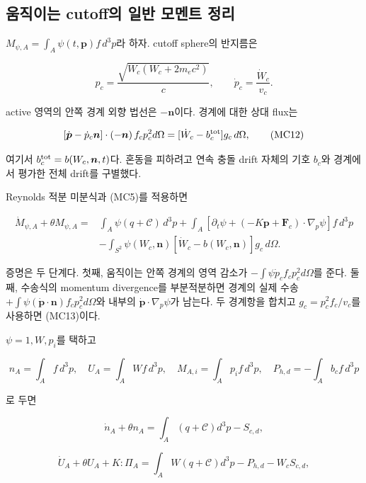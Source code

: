 \documentclass[11pt,a4paper]{article}
\begin{document}
\hypertarget{uxc6c0uxc9c1uxc774uxb294-cutoffuxc758-uxc77cuxbc18-uxbaa8uxba58uxd2b8-uxc815uxb9ac}{%
\subsection{움직이는 cutoff의 일반 모멘트 정리}\label{uxc6c0uxc9c1uxc774uxb294-cutoffuxc758-uxc77cuxbc18-uxbaa8uxba58uxd2b8-uxc815uxb9ac}}

\(M_{\psi,A}=\int_A\psi(t,\boldsymbol p)f\,d^3p\)라 하자. cutoff sphere의 반지름은

\[
p_c=\frac{\sqrt{W_c(W_c+2m_ec^2)}}c,
\qquad\dot p_c=\frac{\dot W_c}{v_c}.
\tag{MC11}
\]

active 영역의 안쪽 경계 외향 법선은 \(-\boldsymbol n\)이다. 경계에 대한 상대 flux는

\[
[\dot{\boldsymbol p}-\dot p_c\boldsymbol n]\cdot(-\boldsymbol n)
\,f_c p_c^2d\Omega
=[\dot W_c-b_c^{\rm tot}]g_c\,d\Omega,
\tag{MC12}
\]

여기서 \(b_c^{\rm tot}=b(W_c,\boldsymbol n,t)\)다. 혼동을 피하려고 연속 충돌 drift 자체의 기호 \(b_c\)와 경계에서 평가한 전체 drift를 구별했다.

Reynolds 적분 미분식과 (MC5)를 적용하면

\[
\begin{split}
\dot M_{\psi,A}+\theta M_{\psi,A}
={}&\int_A\psi(q+\mathcal C)\,d^3p
+\int_A[\partial_t\psi+
(-K\boldsymbol p+\boldsymbol F_c)\cdot\nabla_p\psi]f\,d^3p\\
&-\int_{S^2}\psi(W_c,\boldsymbol n)
[\dot W_c-b(W_c,\boldsymbol n)]g_c\,d\Omega.
\end{split}
\tag{MC13}
\]

증명은 두 단계다. 첫째, 움직이는 안쪽 경계의 영역 감소가 \(-\int\psi\dot p_cf_cp_c^2d\Omega\)를 준다. 둘째, 수송식의 momentum divergence를 부분적분하면 경계의 실제 수송 \(+\int\psi(\dot{\boldsymbol p}\cdot\boldsymbol n)f_cp_c^2d\Omega\)와 내부의 \(\dot{\boldsymbol p}\cdot\nabla_p\psi\)가 남는다. 두 경계항을 합치고 \(g_c=p_c^2f_c/v_c\)를 사용하면 (MC13)이다.

\(\psi=1,W,p_i\)를 택하고

\[
n_A=\int_A f\,d^3p,\quad U_A=\int_AWf\,d^3p,\quad
M_{A,i}=\int_Ap_if\,d^3p,\quad
P_{h,d}=-\int_A b_c f\,d^3p
\tag{MC14}
\]

로 두면

\[
\dot n_A+\theta n_A=\int_A(q+\mathcal C)d^3p-S_{c,d},
\tag{MC15}
\]

\[
\dot U_A+\theta U_A+K:\Pi_A
=\int_AW(q+\mathcal C)d^3p-P_{h,d}-W_cS_{c,d},
\tag{MC16}
\]
\end{document}
